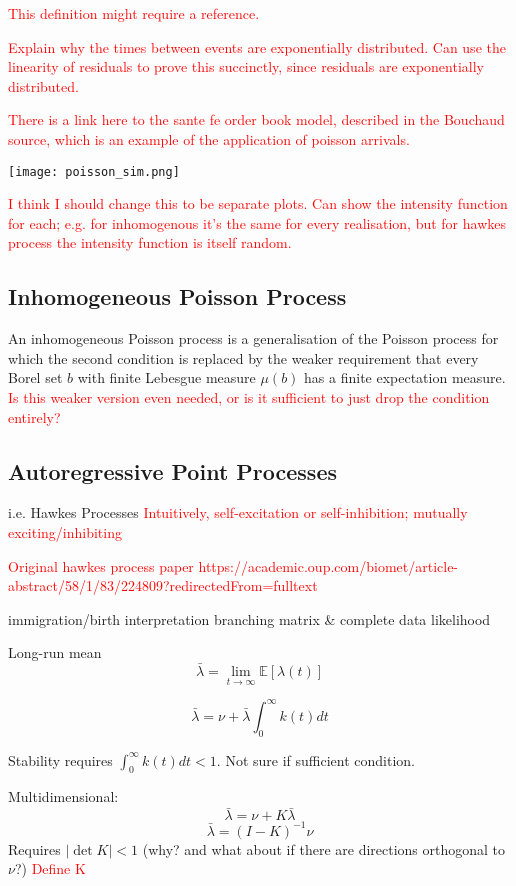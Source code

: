 \documentclass[honours,12pt]{unswthesis}
\numberwithin{equation}{section}
\begin{document}
\textcolor{red}{This definition might require a reference.}

\textcolor{red}{Explain why the times between events are exponentially distributed. Can use the linearity of residuals to prove this succinctly, since residuals are exponentially distributed.}

\textcolor{red}{There is a link here to the sante fe order book model, described in the Bouchaud source, which is an example of the application of poisson arrivals.}

\texttt{[image: poisson\_sim.png]}

\textcolor{red}{I think I should change this to be separate plots. Can show the intensity function for each; e.g. for inhomogenous it's the same for every realisation, but for hawkes process the intensity function is itself random.}

\subsection{Inhomogeneous Poisson Process}
An inhomogeneous Poisson process is a generalisation of the Poisson process for which the second condition is replaced by the weaker requirement that every Borel set $b$ with finite Lebesgue measure $\mu(b)$ has a finite expectation measure. \textcolor{red}{Is this weaker version even needed, or is it sufficient to just drop the condition entirely?}

\subsection{Autoregressive Point Processes}
i.e. Hawkes Processes
\textcolor{red}{Intuitively, self-excitation or self-inhibition; mutually exciting/inhibiting}

\textcolor{red}{Original hawkes process paper https://academic.oup.com/biomet/article-abstract/58/1/83/224809?redirectedFrom=fulltext}

immigration/birth interpretation
branching matrix \& complete data likelihood

Long-run mean $$\bar\lambda = \lim_{t\to\infty} \mathbb E\left[\lambda(t)\right]$$

$$\bar\lambda = \nu + \bar\lambda \int_0^\infty k(t)dt$$

Stability requires $\int_0^\infty k(t)dt < 1$. Not sure if sufficient condition.

Multidimensional:
$$\bar\lambda = \nu + K \bar\lambda$$
$$\bar\lambda = (I-K)^{-1}\nu$$
Requires $\vert\det K\vert < 1$ (why? and what about if there are directions orthogonal to $\nu$?)
\textcolor{red}{Define K}
\end{document}
